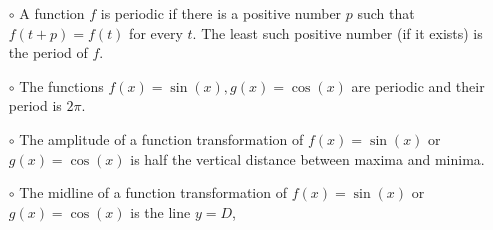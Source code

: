 \documentclass[12pt,dvipsnames]{article}
\begin{document}
\begin{mdframed}[style=testframe]
	\begin{itemize}
		\item[$\circ$] A function $f$ is periodic if there is a positive number $p$ such that $f(t+p)=f(t)$ for every $t$. The least such positive number (if it exists) is the period of $f$.
		\item[$\circ$] The functions $\displaystyle f(x)=\sin (x), g(x)=\cos (x)$ are periodic and their period is $2\pi$.
		\item[$\circ$] The amplitude of a function transformation of $\displaystyle f(x)=\sin (x)$ or  $\displaystyle g(x)=\cos (x)$ 	 is half the vertical distance between maxima and minima.
		\item[$\circ$] The midline of a function transformation of $\displaystyle f(x)=\sin (x)$ or $\displaystyle g(x)=\cos (x)$ is the line $y=D$, 
		
	\end{itemize}
	
\end{mdframed}
\end{document}
